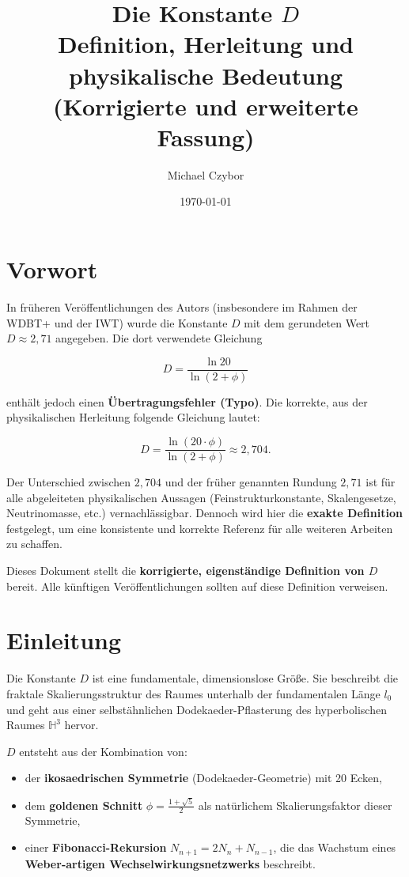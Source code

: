 \documentclass[11pt,a4paper]{article}
\title{Die Konstante \(D\) \\[0.3cm]
\large Definition, Herleitung und physikalische Bedeutung \\[0.2cm]
\large (Korrigierte und erweiterte Fassung)}
\author{Michael Czybor}
\date{\today}
\begin{document}
\maketitle

\section*{Vorwort}

In früheren Veröffentlichungen des Autors (insbesondere im Rahmen der WDBT+ und der IWT) wurde die Konstante \(D\) mit dem gerundeten Wert \(D \approx 2{,}71\) angegeben. Die dort verwendete Gleichung

\[
D = \frac{\ln 20}{\ln(2 + \phi)}
\]

enthält jedoch einen \textbf{Übertragungsfehler (Typo)}. Die korrekte, aus der physikalischen Herleitung folgende Gleichung lautet:

\[
D = \frac{\ln(20 \cdot \phi)}{\ln(2 + \phi)} \approx 2{,}704.
\]

Der Unterschied zwischen \(2{,}704\) und der früher genannten Rundung \(2{,}71\) ist für alle abgeleiteten physikalischen Aussagen (Feinstrukturkonstante, Skalengesetze, Neutrinomasse, etc.) vernachlässigbar. Dennoch wird hier die \textbf{exakte Definition} festgelegt, um eine konsistente und korrekte Referenz für alle weiteren Arbeiten zu schaffen.

Dieses Dokument stellt die \textbf{korrigierte, eigenständige Definition von \(D\)} bereit. Alle künftigen Veröffentlichungen sollten auf diese Definition verweisen.

\section{Einleitung}

Die Konstante \(D\) ist eine fundamentale, dimensionslose Größe. Sie beschreibt die fraktale Skalierungsstruktur des Raumes unterhalb der fundamentalen Länge \(l_0\) und geht aus einer selbstähnlichen Dodekaeder-Pflasterung des hyperbolischen Raumes \(\mathbb{H}^3\) hervor.

\(D\) entsteht aus der Kombination von:

\begin{itemize}
    \item der \textbf{ikosaedrischen Symmetrie} (Dodekaeder-Geometrie) mit 20 Ecken,
    \item dem \textbf{goldenen Schnitt} \(\phi = \frac{1+\sqrt{5}}{2}\) als natürlichem Skalierungsfaktor dieser Symmetrie,
    \item einer \textbf{Fibonacci-Rekursion} \(N_{n+1} = 2N_n + N_{n-1}\), die das Wachstum eines \textbf{Weber-artigen Wechselwirkungsnetzwerks} beschreibt.
\end{itemize}
\end{document}
